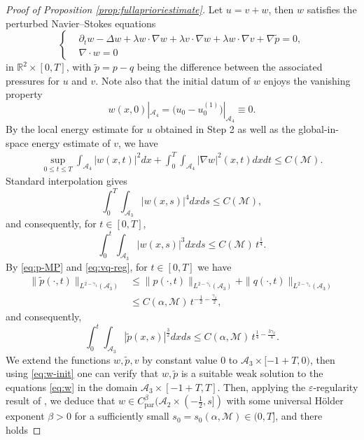 \documentclass[12pt,reqno]{amsart}
\theoremstyle{plain}
\theoremstyle{definition}
\newcommand{\R}{\mathbb{R}}
\newcommand{\M}{\mathcal{M}}
\newcommand{\A}{\mathcal{A}}
\renewcommand{\:}{\colon}
\let\div\relax
\DeclareMathOperator{\div}{div}
\numberwithin{equation}{section}
\numberwithin{figure}{section}
\begin{document}
\begin{proof}[Proof of Proposition \ref{prop:fullaprioriestimate}]
Let $u = v + w$, then $w$ satisfies the perturbed Navier--Stokes equations
\begin{equation} \label{eq:w}
    \left\{\begin{aligned}
            &\partial_t w -\Delta w + \lambda w \cdot \nabla w + \lambda v \cdot \nabla w + \lambda w \cdot \nabla v + \nabla \widetilde{p} = 0,    \\
            &\nabla \cdot w = 0
    \end{aligned}\right.
\end{equation}
in  $\R^2 \times [0, T]$, with $\widetilde{p} = p - q$ being the difference between the associated pressures for $u$ and $v$. Note also that the initial datum of $w$ enjoys the vanishing property
\begin{equation} \label{eq:w-init}
    w(x,0)|_{\A_4} = \big(u_0-u_0^{(1)}\big)|_{\A_4} \equiv 0.
\end{equation}
By the local energy estimate for $u$ obtained in Step 2 as well as the global-in-space energy estimate of $v$, we have
\begin{align}
    \sup_{0\le t \le T} \int_{\A_4} |w(x,t)|^2 dx + \int_0^{T} \int_{\A_4} |\nabla w|^2(x,t) dx dt  \le C(\M).
\end{align}
Standard interpolation gives
\begin{equation}
     \int_0^{T} \int_{\A_3} |w(x,s)|^4 dxds \le C(\M),
\end{equation}
and consequently, for $t\in [0,T]$,
\begin{equation}
    \int_0^{t} \int_{\A_3} |w(x,s)|^3 dxds \le  C(\M) \, t^{\frac14}.
\end{equation}
By \eqref{eq:p-MP} and \eqref{eq:vq-reg}, for $t \in [0, T]$ we have
\begin{align}
    \|\widetilde{p}(\cdot, t)\|_{L^{2-{\gamma_1}}(\A_3)} &\le \|p(\cdot, t)\|_{L^{2-{\gamma_1}}(\A_3)} + \|q(\cdot, t)\|_{L^{2-{\gamma_1}}(\A_3)} \nonumber \\
    &\le  C(\alpha, \M) \, t^{-\frac12 - \frac{{\gamma_2}}{2} },
\end{align}
and consequently,
\begin{equation}
    \int_0^{t} \int_{\A_3} |\widetilde{p}(x,s)|^{\frac32} dxds \le C(\alpha, \M) \, t^{\frac14 - \frac{3\gamma_2}{4} }.
\end{equation}
We extend the functions $w, \widetilde{p}, v$ by constant value $0$ to $\A_3 \times [-1+T, 0)$, then using \eqref{eq:w-init} one can verify that $w, \widetilde{p}$ is a suitable weak solution to the equations \eqref{eq:w} in the domain $\A_3 \times [-1+T, T]$.  Then, applying the $\varepsilon$-regularity result of \cite{jiasverakselfsim}, we deduce that $w \in C^\beta_{\text{par}}(\A_{2} \times (-\frac12, s])$ with some universal H\"older exponent $\beta>0$  for a sufficiently small $s_0 = s_0(\alpha, \M) \in (0, T]$, and there holds

\end{proof}
\end{document}
